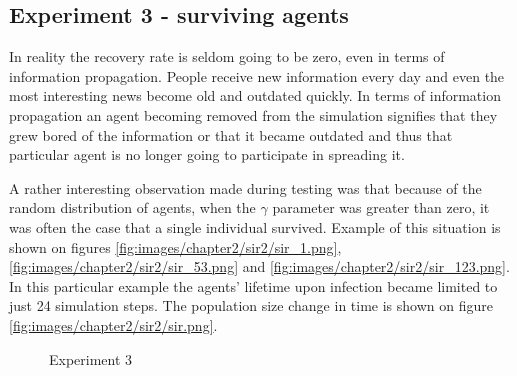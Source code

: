 \subsection{Experiment 3 - surviving agents}

In reality the recovery rate is seldom going to be zero, even in terms of information propagation.
People receive new information every day and even the most interesting news become old and outdated quickly.
In terms of information propagation an agent becoming removed from the simulation signifies that they grew bored of the information or that it became outdated and thus that particular agent is no longer going to participate in spreading it.


A rather interesting observation made during testing was that because of the random distribution of agents, when the $\gamma$ parameter was greater than zero, it was often the case that a single individual survived.
Example of this situation is shown on figures \ref{fig:images/chapter2/sir2/sir_1.png}, \ref{fig:images/chapter2/sir2/sir_53.png} and \ref{fig:images/chapter2/sir2/sir_123.png}.
In this particular example the agents' lifetime upon infection became limited to just 24 simulation steps.
The population size change in time is shown on figure \ref{fig:images/chapter2/sir2/sir.png}.


\begin{figure}[H]
    \centering
    \hspace*{\fill}
    \hspace*{\fill}

    \caption{Experiment 3} \label{fig:experiment2}
\end{figure}


